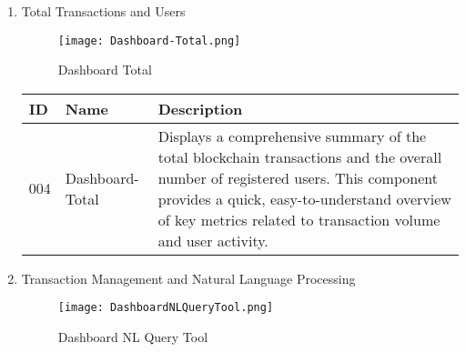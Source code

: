 \documentclass[conference]{IEEEtran}
\begin{document}
\begin{enumerate}[itemsep=2ex, parsep=1ex]
\begin{enumerate}[itemsep=2ex, parsep=1ex]
                  \clearpage
	      	      	      	      
	      	\item Total Transactions and Users

                \begin{figure}[h!]
                    \centering
                    \texttt{[image: Dashboard-Total.png]}
                    \caption{Dashboard Total}
                    \label{fig:enter-label}
                \end{figure}
            
	      	      \begin{table}[h!]
	      	      	\def\arraystretch{1.24} \small
	      	      	\begin{tabular}{|p{1.2cm}|p{2.5cm}|p{4.0cm}|}
	      	      		\hline
	      	      		ID  & Name            & Description                                                                                                                                                                                                                                    \\
	      	      		\hline
	      	      		004 & Dashboard-Total & Displays a comprehensive summary of the total blockchain transactions and the overall number of registered users. This component provides a quick, easy-to-understand overview of key metrics related to transaction volume and user activity. \\
	      	      		\hline
	      	      	\end{tabular}
	      	      \end{table}
	      	      	      	      
	      	\item Transaction Management and Natural Language Processing

            \begin{figure}[h!]
                \centering
                \texttt{[image: DashboardNLQueryTool.png]}
                \caption{Dashboard NL Query Tool}
                \label{fig:enter-label}
            \end{figure}

            \vspace{5cm}
            

\end{enumerate}
\end{enumerate}
\end{document}
